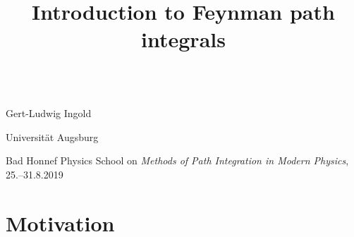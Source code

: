 \documentclass[t,dvipsnames]{beamer}
\title[Introduction to Feynman path integrals]%
      {Introduction to Feynman path integrals}
\begin{document}
\begin{frame}[t]{}
 \vspace{2.0truecm}
 \begin{center}
   \\[0.2truecm]

   \vspace{0.1truecm}
   {\Large Gert-Ludwig Ingold}

   {\large Universität Augsburg}

   \vspace{3.4truecm}
   {\scriptsize Bad Honnef Physics School on \textit{Methods of Path Integration in
    Modern Physics}, 25.--31.8.2019}
 \end{center}
\end{frame}

\navtrue

\section{Motivation}

\begin{frame}[c]{}
 \begin{center}
  \begin{minipage}{0.8\textwidth}
  \end{minipage}
 \end{center}
\end{frame}
\end{document}
